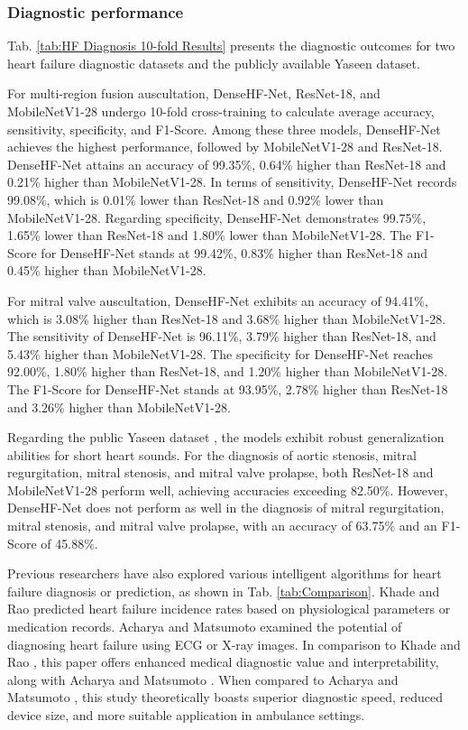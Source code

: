 \subsubsection{Diagnostic performance}
Tab. \ref{tab:HF Diagnosis 10-fold Results} presents the diagnostic outcomes for two heart failure diagnostic datasets and the publicly available Yaseen dataset.

For multi-region fusion auscultation, DenseHF-Net, ResNet-18, and MobileNetV1-28 undergo 10-fold cross-training to calculate average accuracy, sensitivity, specificity, and F1-Score. Among these three models, DenseHF-Net achieves the highest performance, followed by MobileNetV1-28 and ResNet-18. DenseHF-Net attains an accuracy of 99.35\%, 0.64\% higher than ResNet-18 and 0.21\% higher than MobileNetV1-28. In terms of sensitivity, DenseHF-Net records 99.08\%, which is 0.01\% lower than ResNet-18 and 0.92\% lower than MobileNetV1-28. Regarding specificity, DenseHF-Net demonstrates 99.75\%, 1.65\% lower than ResNet-18 and 1.80\% lower than MobileNetV1-28. The F1-Score for DenseHF-Net stands at 99.42\%, 0.83\% higher than ResNet-18 and 0.45\% higher than MobileNetV1-28.

For mitral valve auscultation, DenseHF-Net exhibits an accuracy of 94.41\%, which is 3.08\% higher than ResNet-18 and 3.68\% higher than MobileNetV1-28. The sensitivity of DenseHF-Net is 96.11\%, 3.79\% higher than ResNet-18, and 5.43\% higher than MobileNetV1-28. The specificity for DenseHF-Net reaches 92.00\%, 1.80\% higher than ResNet-18, and 1.20\% higher than MobileNetV1-28. The F1-Score for DenseHF-Net stands at 93.95\%, 2.78\% higher than ResNet-18 and 3.26\% higher than MobileNetV1-28.

Regarding the public Yaseen dataset \cite{son2018classification}, the models exhibit robust generalization abilities for short heart sounds. For the diagnosis of aortic stenosis, mitral regurgitation, mitral stenosis, and mitral valve prolapse, both ResNet-18 and MobileNetV1-28 perform well, achieving accuracies exceeding 82.50\%. However, DenseHF-Net does not perform as well in the diagnosis of mitral regurgitation, mitral stenosis, and mitral valve prolapse, with an accuracy of 63.75\% and an F1-Score of 45.88\%.

Previous researchers have also explored various intelligent algorithms for heart failure diagnosis or prediction, as shown in Tab. \ref{tab:Comparison}. Khade \cite{khade2019system} and Rao \cite{rao2022explainable} predicted heart failure incidence rates based on physiological parameters or medication records. Acharya \cite{acharya2019deep} and Matsumoto \cite{matsumoto2020diagnosing} examined the potential of diagnosing heart failure using ECG or X-ray images. In comparison to Khade \cite{khade2019system} and Rao \cite{rao2022explainable}, this paper offers enhanced medical diagnostic value and interpretability, along with Acharya \cite{acharya2019deep} and Matsumoto \cite{matsumoto2020diagnosing}. When compared to Acharya \cite{acharya2019deep} and Matsumoto \cite{matsumoto2020diagnosing}, this study theoretically boasts superior diagnostic speed, reduced device size, and more suitable application in ambulance settings.

